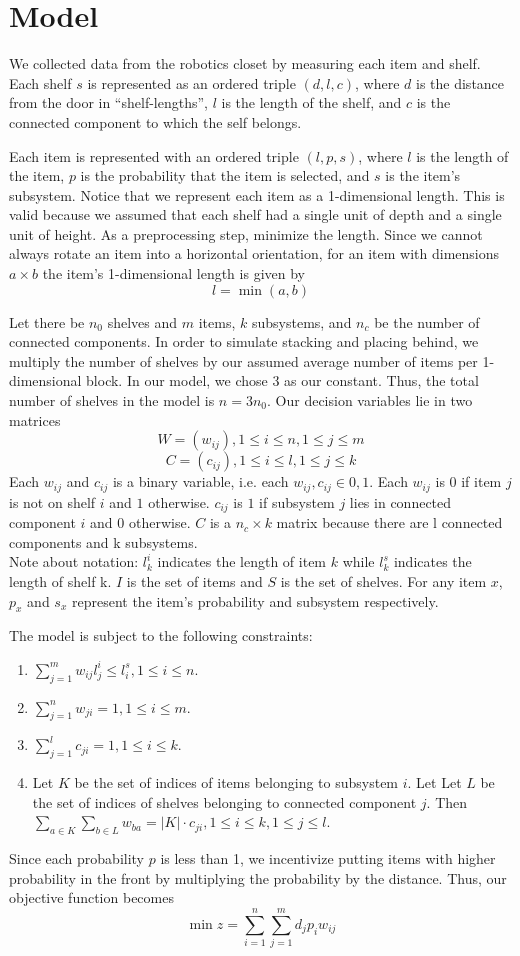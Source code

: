 \documentclass[10pt]{article}
\theoremstyle{named}
\begin{document}
\section{Model}
We collected data from the robotics closet by measuring each item and shelf. Each
shelf $s$ is represented as an ordered triple $(d, l, c)$, where $d$ is the
distance from the door in ``shelf-lengths'', $l$ is the length of the shelf, and
$c$ is the connected component to which the self belongs.
\par
Each item is represented with an ordered triple $(l, p, s)$, where $l$ is the length
of the item, $p$ is the probability that the item is selected, and $s$ is the item's
subsystem. Notice that we represent each item as a 1-dimensional length. This is valid
because we assumed that each shelf had a single unit of depth and a single
unit of height. As a preprocessing step, minimize the length. Since we cannot always
rotate an item into a horizontal orientation, for an item with dimensions $a \times b$
the item's 1-dimensional length is given by 
$$l = \min(a, b)$$
\par
Let there be $n_0$ shelves and $m$ items, $k$ subsystems, and $n_c$ be the number of
connected components. In order to simulate stacking and placing behind, we
multiply the number of shelves by our assumed average number of items per
1-dimensional block. In our model, we chose 3 as our constant. Thus,
the total number of shelves in the model is $n = 3n_0$. 
Our decision variables lie in two matrices
$$W = (w_{ij}), 1 \leq i \leq n, 1 \leq j \leq m$$
$$C = (c_{ij}), 1 \leq i \leq l, 1 \leq j \leq k$$
Each $w_{ij}$ and $c_{ij}$ is a binary variable, i.e. each $w_{ij}, c_{ij} \in {0, 1}$.
Each $w_{ij}$ is $0$ if item $j$ is not on shelf $i$ and $1$ otherwise. $c_{ij}$ is
$1$ if subsystem $j$ lies in connected component $i$ and $0$ otherwise. 
$C$ is a $n_c \times k$ matrix because there are l connected components and k subsystems. \\
Note about notation: $l^i_k$ indicates the length of item $k$ while $l^s_k$ indicates the
length of shelf k. $I$ is the set of items and $S$ is the set of shelves. For any item
$x$, $p_x$ and $s_x$ represent the item's probability and subsystem respectively. 
\par
The model is subject to the following constraints:
\begin{enumerate}
\item $\sum_{j = 1}^{m}w_{ij}l^i_j \leq l^s_i, 1 \leq i \leq n$.
\item $\sum_{j = 1}^{n}w_{ji} = 1, 1 \leq i \leq m$.
\item $\sum_{j = 1}^{l}c_{ji} = 1, 1 \leq i \leq k$.
\item Let $K$ be the set of indices of items belonging to subsystem $i$. Let
  Let $L$ be the set of indices of shelves belonging to connected component $j$.
  Then $\sum_{a \in K}\sum_{b \in L}w_{ba} = |K| \cdot c_{ji}, 1 \leq i \leq k, 1 \leq j \leq l$.
\end{enumerate}
Since each probability $p$ is less than 1, we incentivize putting items with higher probability
in the front by multiplying the probability by the distance. Thus, our objective function
becomes
$$\min z = \sum_{i = 1}^{n}\sum_{j = 1}^{m} d_j p_i w_{ij}$$
\end{document}
